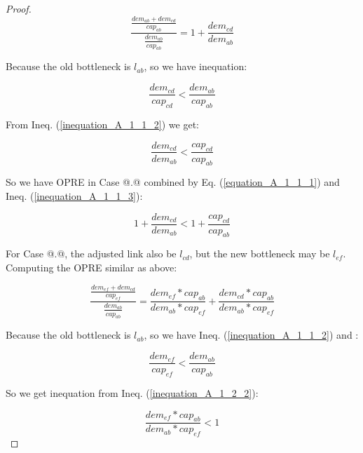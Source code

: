 \documentclass[conference]{IEEEtran}
\makeatletter
\newcommand{\Rmnum}[1]{\expandafter\@slowromancap\romannumeral #1@}
\makeatother
\begin{document}
\begin{proof}
\begin{equation}
\label{equation_A_1_1_1}
\frac {\frac{dem_{ab} + dem_{cd}}{cap_{ab}}} {\frac{dem_{ab}}{cap_{ab}}} = 1 + \frac{dem_{cd}}{dem_{ab}}
\end{equation}

Because the old bottleneck is $l_{ab}$, so we have inequation:

\begin{equation}
\label{inequation_A_1_1_2}
\frac {dem_{cd}} {cap_{cd}} < \frac {dem_{ab}} {cap_{ab}}
\end{equation}

From Ineq. (\ref{inequation_A_1_1_2}) we get:

\begin{equation}
\label{inequation_A_1_1_3}
\frac {dem_{cd}} {dem_{ab}} < \frac {cap_{cd}} {cap_{ab}}
\end{equation}

So we have OPRE in Case \Rmnum{1}.\Rmnum{1} combined by Eq. (\ref{equation_A_1_1_1}) and Ineq. (\ref{inequation_A_1_1_3}):

\begin{equation}
\label{inequation_A_1_1_result}
1 + \frac {dem_{cd}} {dem_{ab}} < 1 + \frac {cap_{cd}} {cap_{ab}}
\end{equation}

For Case \Rmnum{1}.\Rmnum{2}, the adjusted link also be $l_{cd}$, but the new bottleneck may be $l_{ef}$.
Computing the OPRE similar as above:

\begin{equation}
\label{equation_A_1_2_1}
\frac {\frac{dem_{ef} + dem_{cd}}{cap_{ef}}} {\frac{dem_{ab}}{cap_{ab}}} =
\frac {dem_{ef} * cap_{ab}}{dem_{ab} * cap_{ef}} + \frac {dem_{cd} * cap_{ab}}{dem_{ab} * cap_{ef}}
\end{equation}

Because the old bottleneck is $l_{ab}$, so we have Ineq. (\ref{inequation_A_1_1_2}) and :

\begin{equation}
\label{inequation_A_1_2_2}
\frac {dem_{ef}} {cap_{ef}} < \frac {dem_{ab}} {cap_{ab}}
\end{equation}

So we get inequation from Ineq. (\ref{inequation_A_1_2_2}):

\begin{equation}
\label{inequation_A_1_2_3}
\frac {dem_{ef} * cap_{ab}} {dem_{ab} * cap_{ef}} < 1
\end{equation}


\end{proof}
\end{document}
